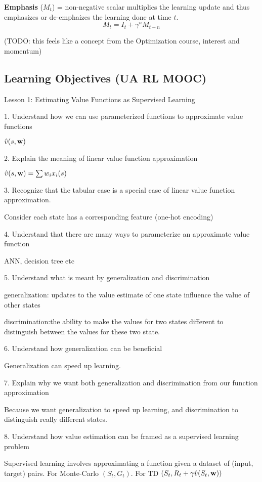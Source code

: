 \documentclass[sutton_barto_notes.tex]{subfiles}
\begin{document}
\textbf{Emphasis} ($M_t$) = non-negative scalar multiplies the learning update and thus emphasizes or de-emphaizes the learning done at time $t$.
$$ M_t = I_t + \gamma^n M_{t-n} $$

 (TODO: this feels like a concept from the Optimization course, interest and momentum)


\newpage
\subsection{Learning Objectives (UA RL MOOC)}

Lesson 1: Estimating Value Functions as Supervised Learning 

1. Understand how we can use parameterized functions to approximate value functions 

$\hat{v}(s, {\operatorname*{\mathbf{w}}})$

2. Explain the meaning of linear value function approximation 

$\hat{v}(s, {\operatorname*{\mathbf{w}}}) = \sum w_i x_i(s)$

3. Recognize that the tabular case is a special case of linear value function approximation. 

Consider each state has a corresponding feature (one-hot encoding)

4. Understand that there are many ways to parameterize an approximate value function 

ANN, decision tree etc

5. Understand what is meant by generalization and discrimination 

generalization: updates to the value estimate of one state influence the value of other states

discrimination:the ability to make the values for two states different to distinguish between the values for these two state.

6. Understand how generalization can be beneficial 

Generalization can speed up learning.

7. Explain why we want both generalization and discrimination from our function approximation 

Because we want generalization to speed up learning, and discrimination to distinguish really different states.

8. Understand how value estimation can be framed as a supervised learning problem 

Supervised learning involves approximating a function given a dataset of (input, target) pairs. For Monte-Carlo $(S_t, G_t)$. For TD $(S_t, R_t+\gamma\hat{v}(S_t, {\operatorname*{\mathbf{w}}}))$
\end{document}
